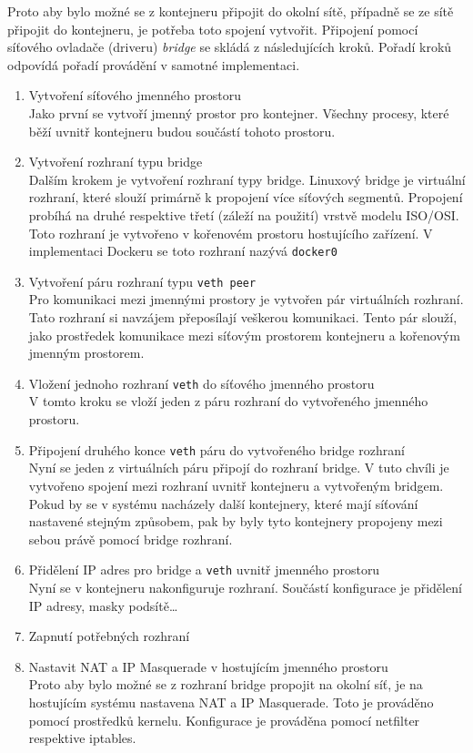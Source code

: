 Proto aby bylo možné se z kontejneru připojit do okolní sítě, případně se ze sítě připojit do kontejneru, je potřeba toto spojení vytvořit. Připojení pomocí síťového ovladače (driveru) \textit{bridge} se skládá z následujících kroků. Pořadí kroků odpovídá pořadí provádění v samotné implementaci.
\begin{enumerate}
\item Vytvoření síťového jmenného prostoru\\
Jako první se vytvoří jmenný prostor pro kontejner. Všechny procesy, které běží uvnitř kontejneru budou součástí tohoto prostoru.%
\item Vytvoření rozhraní typu bridge\\
Dalším krokem je vytvoření rozhraní typy bridge. Linuxový bridge je virtuální rozhraní, které slouží primárně k propojení více síťových segmentů. Propojení probíhá na druhé respektive třetí (záleží na použití) vrstvě modelu ISO/OSI. Toto rozhraní je vytvořeno v kořenovém prostoru hostujícího zařízení. V implementaci Dockeru se toto rozhraní nazývá \verb|docker0|
\item Vytvoření páru rozhraní typu \verb|veth peer|\\
Pro komunikaci mezi jmennými prostory je vytvořen pár virtuálních rozhraní. Tato rozhraní si navzájem přeposílají veškerou komunikaci. Tento pár slouží, jako prostředek komunikace mezi síťovým prostorem kontejneru a kořenovým jmenným prostorem.
\item Vložení jednoho rozhraní \verb|veth| do síťového jmenného prostoru\\
V tomto kroku se vloží jeden z páru rozhraní do vytvořeného jmenného prostoru. 
\item Připojení druhého konce \verb|veth| páru do vytvořeného bridge rozhraní\\
Nyní se jeden z virtuálních páru připojí do rozhraní bridge. V tuto chvíli je vytvořeno spojení mezi rozhraní uvnitř kontejneru a vytvořeným bridgem. Pokud by se v systému nacházely další kontejnery, které mají síťování nastavené stejným způsobem, pak by byly tyto kontejnery propojeny mezi sebou právě pomocí bridge rozhraní.
\item Přidělení IP adres pro bridge a \verb|veth| uvnitř jmenného prostoru\\
Nyní se v kontejneru nakonfiguruje rozhraní. Součástí konfigurace je přidělení IP adresy, masky podsítě\ldots  
\item Zapnutí potřebných rozhraní
\item Nastavit NAT a IP Masquerade v hostujícím jmenného prostoru\\
Proto aby bylo možné se z rozhraní bridge propojit na okolní síť, je na hostujícím systému nastavena NAT a IP Masquerade. Toto je prováděno pomocí prostředků kernelu. Konfigurace je prováděna pomocí netfilter respektive iptables.
\end{enumerate}


